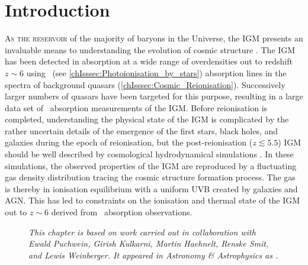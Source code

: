
\section{Introduction}
\label{chPsec:Introduction}

\lettrine{A}{s the reservoir} of the majority of baryons in the Universe, the IGM presents an invaluable means to understanding the evolution of cosmic structure \citep{2009RvMP...81.1405M}. The IGM has been detected in absorption at a wide range of overdensities out to redshift $z \sim 6$ using  \lya\ (see \cref{chIsssec:Photoionisation_by_stars}) absorption lines in the spectra of background quasars (\cref{chIsssec:Cosmic_Reionisation}). Successively larger numbers of quasars have been targeted for this purpose, resulting in a large data set of \lya\ absorption measurements of the IGM. Before reionisation is completed, understanding the physical state of the IGM is complicated by the rather uncertain details of the emergence of the first stars, black holes, and galaxies during the epoch of reionisation, but the post-reionisation ($z \lesssim 5.5$) IGM should be well described by cosmological hydrodynamical simulations \citep{1994ApJ...437L...9C, 1996ApJ...457L..51H, 1999elss.conf..346W, 2017ApJ...837..106O, 2019MNRAS.486.4075O, 2015MNRAS.446.3697L, 2017MNRAS.464..897B}. In these simulations, the observed properties of the IGM are reproduced by a fluctuating gas density distribution tracing the cosmic structure formation process. The gas is thereby in ionisation equilibrium with a uniform UVB created by galaxies and AGN. This has led to constraints on the ionisation and thermal state of the IGM out to $z \sim 6$ \citep{1997ApJ...489....7R, 1999ApJ...511..521D, 2000MNRAS.318..817S, 2003MNRAS.342.1205M, 2008ApJ...688...85F, 2011MNRAS.410.1096B, 2012MNRAS.419.2880B, 2013MNRAS.436.1023B, 2017PhLB..773..258G, 2019ApJ...872...13W, 2019MNRAS.486..769K} derived from \lya\ absorption observations.
\begin{figure}
    \begin{mdframed}[backgroundcolor=black!2.5]
        \textsl{This chapter is based on work carried out in collaboration with Ewald Puchwein, Girish Kulkarni, Martin Haehnelt, Renske Smit, and Lewis Weinberger. It appeared in Astronomy \& Astrophysics as \citet*{2021A&A...650A..98W}.}
    \end{mdframed}
\end{figure}

